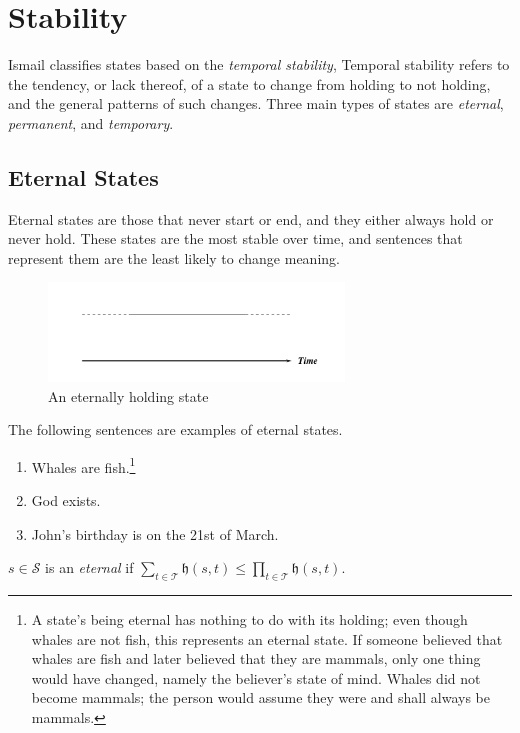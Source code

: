 \section{Stability}
Ismail \cite{ismail2013stability} classifies states based on the \textit{temporal stability}, Temporal stability refers to the tendency, or
lack thereof, of a state to change from holding to not holding, and the general patterns of such changes.
Three main types of states are \textit{eternal}, \textit{permanent}, and \textit{temporary}.

\subsection{Eternal States}
Eternal states are those that never start or end, and they either always hold or never hold.
These states are the most stable over time, and sentences that represent them are the least likely to change meaning.
\begin{figure}[H]
	\centering
	\includegraphics[width=0.7\textwidth]{images/eternal-states.png}
	\caption{An eternally holding state}
	\label{fig:eternal}
\end{figure}

The following sentences are examples of eternal states.

\begin{enumerate}
	\item Whales are fish.\footnote{A state's being eternal has nothing to do with its holding; even though whales are not fish,
		      this represents an eternal state. If someone believed that whales are fish and later believed that they are mammals, only one thing would have
		      changed, namely the believer's state of mind. Whales did not become mammals; the person
		      would assume they were and shall always be mammals.\cite{ismail2001reasoning}}
	\item God exists.
	\item John's birthday is on the 21st of March.
\end{enumerate}

\begin{defn}
	$s \in \mathcal{S}$ is an \textit{eternal} if $\displaystyle \sum_{t \in \mathcal{T}} \mathfrak{h}(s, t) \leq \prod_{t \in \mathcal{T}} \mathfrak{h}(s, t)$.
\end{defn}

